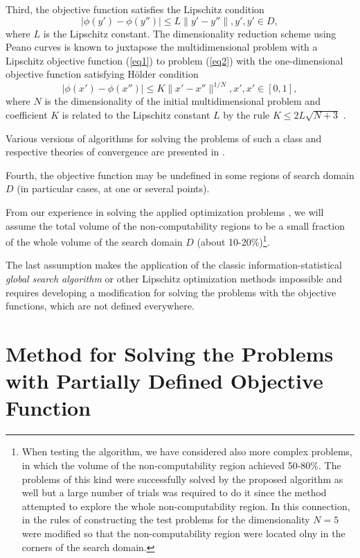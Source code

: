 \documentclass[runningheads]{llncs}
\begin{document}
Third, the objective function satisfies the Lipschitz condition
\begin{equation}\label{eq3} 
| \phi (y')-\phi (y'') | \leq L \| y'-y'' \|, y',y' \in D,
\end{equation}
where $L$ is the Lipschitz constant. The dimensionality reduction scheme using Peano curves is known to juxtapose the multidimensional problem with a Lipschitz objective function (\ref{eq1}) to problem (\ref{eq2}) with the one-dimensional objective function satisfying H{\"o}lder condition
\begin{equation}\label{eq4} 
| \phi (x')-\phi (x'') | \leq K \| x'-x'' \| ^{1/N}, x',x' \in [0,1],
\end{equation}
where $N$ is the dimensionality of the initial multidimensional problem and coefficient $K$ is related to the Lipschitz constant $L$ by the rule $K \leq 2L\sqrt {N+3}$ \cite{Strongin2000}.

Various versions of algorithms for solving the problems of such a class and respective theories of convergence are presented in \cite{Sergeyev2013,Strongin2000}.

Fourth, the objective function may be undefined in some regions of search domain $D$ (in particular cases, at one or several points).

From our experience in solving the applied optimization problems \cite{Barkalov2022,Gubaydullin2022}, we will assume the total volume of the non-computability regions to be a small fraction of the whole volume of the search domain $D$ (about 10-20\%)\footnote{When testing the algorithm, we have considered also more complex problems, in which the volume of the non-computability region achieved 50-80\%. The problems of this kind were successfully solved by the proposed algorithm as well but a large number of trials was required to do it since the method attempted to explore the whole non-computability region. In this connection, in the rules of constructing the test problems for the dimensionality $N=5$ were modified so that the non-computability region were located olny in the corners of the search domain.}.

The last assumption makes the application of the classic information-statistical \textit{global search algorithm} \cite{Strongin2000} or other Lipschitz optimization methods \cite{Sergeyev2017} impossible and requires developing a modification for solving the problems with the objective functions, which are not defined everywhere.

\section{Method for Solving the Problems with Partially Defined Objective Function}
\end{document}
